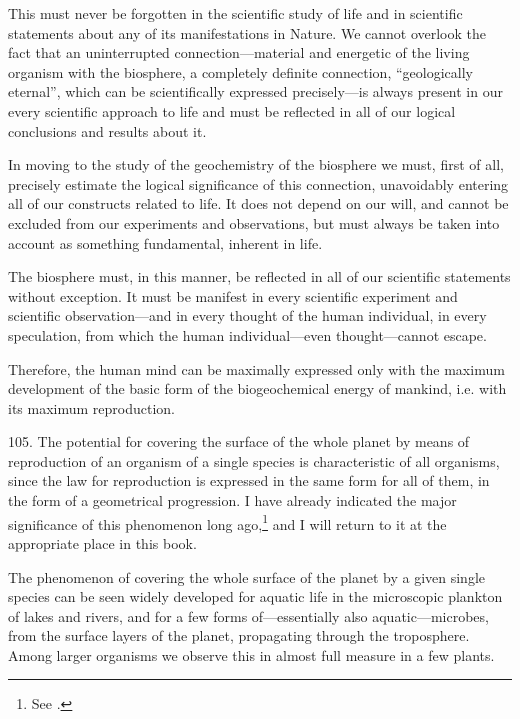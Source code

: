 This must never be forgotten in the scientific study of life and in scientific
statements about any of its manifestations in Nature.  We cannot overlook the
fact that an uninterrupted connection---material and energetic of the living
organism with the biosphere, a completely definite connection, ``geologically
eternal'', which can be scientifically expressed precisely---is always present
in our every scientific approach to life and must be reflected in all of our
logical conclusions and results about it.

In moving to the study of the geochemistry of the biosphere we must, first of
all, precisely estimate the logical significance of this connection,
unavoidably entering all of our constructs related to life.  It does not
depend on our will, and cannot be excluded from our experiments and
observations, but must always be taken into account as something fundamental,
inherent in life.

The biosphere must, in this manner, be reflected in all of our scientific
statements without exception.  It must be manifest in every scientific
experiment and scientific observation---and in every thought of the human
individual, in every speculation, from which the human individual---even
thought---cannot escape.

Therefore, the human mind can be maximally expressed only with the maximum
development of the basic form of the biogeochemical energy of mankind, i.e.
with its maximum reproduction.


105. The potential for covering the surface of the whole planet by means of
reproduction of an organism of a single species is characteristic of all
organisms, since the law for reproduction is expressed in the same form for
all of them, in the form of a geometrical progression.  I have already
indicated the major significance of this phenomenon long ago,\footnote{
	See \cites[37--38]{vernadsky1926biosfera}[335, 413--424]{vernadsky1994zhivoe}{vernadsky1926etudes1}[59--83]{vernadsky1940biogeohimicheskie}[75--101]{vernadsky1992trudy}.
} and I will return to it at the appropriate place in this book.

The phenomenon of covering the whole surface of the planet by a given single
species can be seen widely developed for aquatic life in the microscopic
plankton of lakes and rivers, and for a few forms of---essentially also
aquatic---microbes, from the surface layers of the planet, propagating through
the troposphere.  Among larger organisms we observe this in almost full
measure in a few plants.

